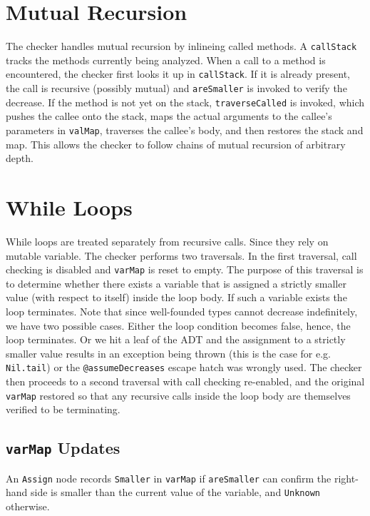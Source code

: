 \section{Mutual Recursion}
The checker handles mutual recursion by inlineing called methods. A
\texttt{callStack} tracks the methods currently being analyzed. When a call to a
method is encountered, the checker first looks it up in \texttt{callStack}.
If it is already present, the call is recursive (possibly mutual) and
\texttt{areSmaller} is invoked to verify the decrease. If the method is not yet
on the stack, \texttt{traverseCalled} is invoked, which pushes the callee onto
the stack, maps the actual arguments to the callee's parameters in
\texttt{valMap}, traverses the callee's body, and then restores the stack and
map. This allows the checker to follow chains of mutual recursion of arbitrary
depth.


\section{While Loops}
While loops are treated separately from recursive calls. Since they rely on
mutable variable. The checker performs two traversals. In the first traversal,
call checking is disabled and \texttt{varMap} is reset to empty. The purpose of
this traversal is to determine whether there exists a variable that is assigned
a strictly smaller value (with respect to itself) inside the loop body. If such
a variable exists the loop terminates. Note that since well-founded types cannot
decrease indefinitely, we have two possible cases. Either the loop condition
becomes false, hence, the loop terminates. Or we hit a leaf of the ADT and the
assignment to a strictly smaller value results in an exception being thrown
(this is the case for e.g. \texttt{Nil.tail}) or the \texttt{@assumeDecreases}
escape hatch was wrongly used.
The checker then proceeds to a second traversal with call checking re-enabled,
and the original \texttt{varMap} restored so that any recursive calls inside the
loop body are themselves verified to be terminating.

\subsection{\texttt{varMap} Updates}
An \texttt{Assign} node records \texttt{Smaller} in \texttt{varMap} if
\texttt{areSmaller} can confirm the right-hand side is smaller than the current
value of the variable, and \texttt{Unknown} otherwise.


